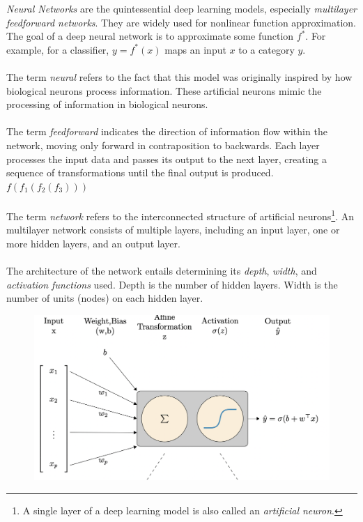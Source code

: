 \documentclass[../main.tex]{subfiles}
\begin{document}
	 
	 \noindent \textit{Neural Networks} are the quintessential deep learning models, especially \textit{multilayer feedforward networks}. They are widely used for nonlinear function approximation. The goal of a deep neural network is to approximate some function $f^*$. For example, for a classifier, $y = f^*(x)$ maps an input $x$ to a category $y$.  \\ \\ 
	 \noindent The term \textit{neural} refers  to the fact that this model was originally inspired by how biological neurons process information. These artificial neurons mimic the processing of information in biological neurons. \\ \\ 
	 \noindent The term \textit{feedforward} indicates the direction of information flow within the network, moving only forward in contraposition to backwards. Each layer processes the input data and passes its output to the next layer, creating a sequence of transformations until the final output is produced. $f(f_1(f_2(f_3)))$ \\ \\
	 \noindent The term \textit{network} refers to the interconnected structure of artificial neurons\footnote{A single layer of a deep learning model is also called an\textit{ artificial neuron}. }. An multilayer network consists of multiple layers, including an input layer, one or more hidden layers, and an output layer. \\ \\ %
	 \noindent The architecture of the network entails determining its \textit{depth}, \textit{width}, and \textit{activation functions} used. Depth is the number of hidden layers. Width is the number of units (nodes) on each hidden layer. 
	 
	 \begin{figure}[h]
	 	\centering
	 	\includegraphics[width=0.6\linewidth]{imgs/neu}
	 \end{figure} \mbox{} \par
	 
\end{document}

